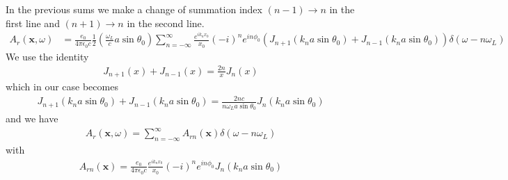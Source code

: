 In the previous sums we make a change of summation index $(n-1)\rightarrow n$ in the first line and $(n+1)\rightarrow n$ in the second line.
\begin{align}
    A_r({\bm x},\omega) & =\frac{e_0}{4\pi\epsilon_0c}\frac12\left(\frac{\omega_L}ca\sin\theta_0\right)\sum\limits_{n=-\infty}^{\infty}\frac{e^{ik_n x_0}}{x_0}(-i)^{n}e^{in\phi_0}(J_{n+1}(k_na\sin\theta_0)+J_{n-1}(k_na\sin\theta_0))\delta(\omega-n\omega_L)
\end{align}
We use the identity
\begin{align}
    J_{n+1}(x)+J_{n-1}(x)=\frac{2 n}{x} J_n(x)
\end{align}
which in our case becomes
\begin{align}
    J_{n+1}(k_na\sin\theta_0)+J_{n-1}(k_na\sin\theta_0)=\frac{2nc}{n\omega_L a\sin\theta_0}J_n(k_na\sin\theta_0)
\end{align}
and we have
\begin{align}
    A_r({\bm x},\omega)=\sum\limits_{n=-\infty}^{\infty}A_{rn}({\bm x})\delta(\omega-n\omega_L)
\end{align}
with
\begin{align}
    A_{rn}({\bm x})=    \frac{e_0}{4\pi\epsilon_0c}\frac{e^{ik_n x_0}}{x_0}(-i)^ne^{in\phi_0}J_n(k_na\sin\theta_0)
\end{align}

